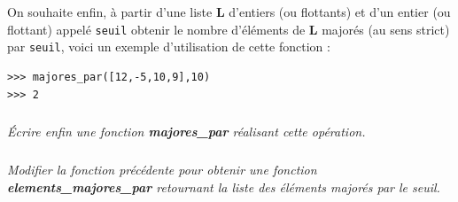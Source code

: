 \documentclass[10pt,fleqn]{article} %
\begin{document}
\ifprof
\begin{corrige}
\end{corrige}
\else
\fi



On souhaite enfin, à partir d'une liste \textbf{L}
 d'entiers (ou flottants) et d'un entier (ou flottant) appelé \texttt{seuil} obtenir le nombre 
 d'éléments de \textbf{L} majorés (au sens strict) par \texttt{seuil}, voici un exemple d'utilisation de cette fonction : 
 \begin{py}
\begin{lstlisting}
>>> majores_par([12,-5,10,9],10)
>>> 2
\end{lstlisting}
\end{py}
\subparagraph{} 
\textit{Écrire enfin une fonction \textbf{majores\_par} réalisant cette opération.}

\ifprof
\begin{corrige}
\end{corrige}
\else
\fi

\subparagraph{}
\textit{Modifier la fonction précédente pour obtenir une fonction \textbf{elements\_majores\_par}
  retournant la liste des éléments majorés par le seuil.}
	
\ifprof
\begin{corrige}
\end{corrige}
\else
\fi
\end{document}
